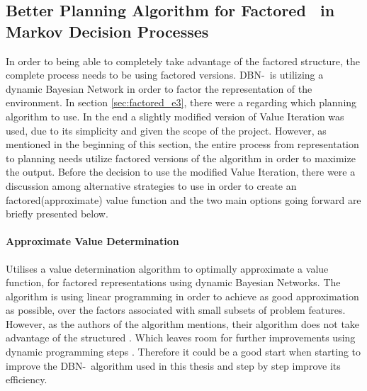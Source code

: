 \subsection{Better Planning Algorithm for Factored \etre\ in Markov Decision Processes }
\label{sec:better_planing_algos}
In order to being able to completely take advantage of the factored structure, the complete process needs to be using factored versions. DBN-\etre\ is utilizing a dynamic Bayesian Network in order to factor the representation of the environment. In section \ref{sec:factored_e3}, there were a  regarding which planning algorithm to use. In the end a slightly modified version of Value Iteration was used, due to its simplicity and given the scope of the project. 
However, as mentioned in the beginning of this section, the entire process from representation to planning needs utilize factored versions of the algorithm in order to maximize the output. Before the decision to use the modified Value Iteration, there were a discussion among alternative strategies to use in order to create an factored(approximate) value function and the two main options going forward are briefly presented below.




\paragraph{Approximate Value Determination}
Utilises a value determination algorithm to optimally approximate a value function, for factored representations using dynamic Bayesian Networks. The algorithm is using linear programming in order to achieve as good approximation as possible, over the factors associated with small subsets of problem features. However, as the authors of the algorithm mentions, their algorithm does not take advantage of the structured . Which leaves room for further improvements using dynamic programming steps \parencite{koller1999computing}. Therefore it could be a good start when starting to improve the DBN-\etre\ algorithm used in this thesis and step by step improve its efficiency. 

